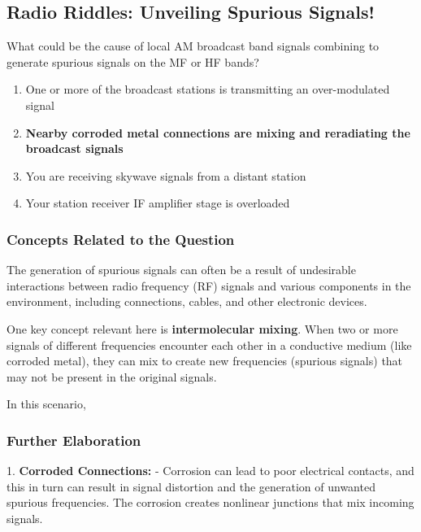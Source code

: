 \subsection{Radio Riddles: Unveiling Spurious Signals!}

\begin{tcolorbox}[colback=gray!10, colframe=black, title=E4E11]

What could be the cause of local AM broadcast band signals combining to generate spurious signals on the MF or HF bands?
\begin{enumerate}[label=\Alph*.]
    \item One or more of the broadcast stations is transmitting an over-modulated signal
    \item \textbf{Nearby corroded metal connections are mixing and reradiating the broadcast signals}
    \item You are receiving skywave signals from a distant station
    \item Your station receiver IF amplifier stage is overloaded
\end{enumerate} \end{tcolorbox}

\subsubsection{Concepts Related to the Question}

The generation of spurious signals can often be a result of undesirable interactions between radio frequency (RF) signals and various components in the environment, including connections, cables, and other electronic devices. 

One key concept relevant here is \textbf{intermolecular mixing}. When two or more signals of different frequencies encounter each other in a conductive medium (like corroded metal), they can mix to create new frequencies (spurious signals) that may not be present in the original signals. 

In this scenario, 

\subsubsection{Further Elaboration}

1. \textbf{Corroded Connections:}
   - Corrosion can lead to poor electrical contacts, and this in turn can result in signal distortion and the generation of unwanted spurious frequencies. The corrosion creates nonlinear junctions that mix incoming signals.

